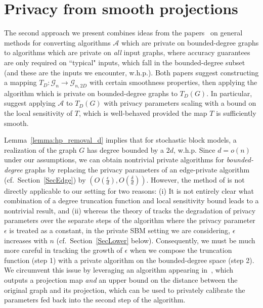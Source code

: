 \documentclass{article}
\begin{document}

\section{Privacy from smooth projections}
\label{SecProj}

The second approach we present combines ideas from the papers~\cite{blocki2013differentially, kasiviswanathan2013analyzing} on general methods for converting algorithms $\mathcal{A}$ which are private on bounded-degree graphs to algorithms which are private on \emph{all} input graphs, where accuracy guarantees are only required on ``typical" inputs, which fall in the bounded-degree subset (and these are the inputs we encounter, w.h.p.). Both papers suggest constructing a mapping $T_D: \mathcal{G}_n \rightarrow \mathcal{G}_{n,2D}$ with certain smoothness properties, then applying the algorithm which is private on bounded-degree graphs to $T_D(G)$. In particular, \cite{kasiviswanathan2013analyzing} suggest applying $\mathcal{A}$ to $T_D(G)$ with privacy parameters scaling with a bound on the local sensitivity of $T$, which is well-behaved provided the map $T$ is sufficiently smooth.

Lemma~\ref{lemma:hp_removal_d} implies that for stochastic block models, a realization of the graph $G$ has degree bounded by a $2d$, w.h.p. Since $d = o(n)$ under our assumptions, we can obtain nontrivial private algorithms for \emph{bounded-degree} graphs by replacing the privacy parameters of an edge-private algorithm (cf.\ Section~\ref{SecEdge}) by $(O(\frac{\epsilon}{d}), O(\frac{\delta}{d}))$.
However, the method of \cite{kasiviswanathan2013analyzing} is not directly applicable to our setting for two reasons: (i) It is not entirely clear what combination of a degree truncation function and local sensitivity bound leads to a nontrivial result, and (ii) whereas the theory of \cite{kasiviswanathan2013analyzing} tracks the degradation of privacy parameters over the separate steps of the algorithm where the privacy parameter $\epsilon$ is treated as a constant, in the private SBM setting we are considering, $\epsilon$ increases with $n$ (cf.\ Section~\ref{SecLower} below). Consequently, we must be much more careful in tracking the growth of $\epsilon$ when we compose the truncation function (step 1) with a private algorithm on the bounded-degree space (step 2). We circumvent this issue by leveraging an algorithm appearing in~\cite{blocki2013differentially}, which outputs a projection map \emph{and} an upper bound on the distance between the original graph and its projection, which can be used to privately calibrate the parameters fed back into the second step of the algorithm.
\end{document}
